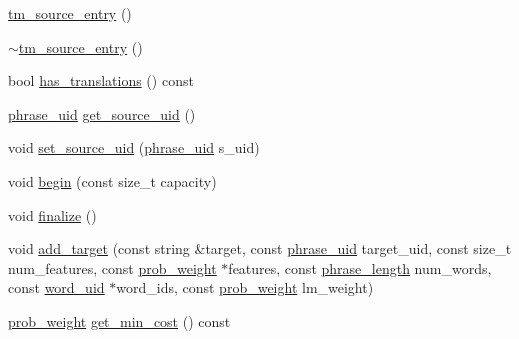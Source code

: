 \begin{DoxyCompactItemize}
\item 
\hyperlink{classuva_1_1smt_1_1bpbd_1_1server_1_1tm_1_1models_1_1tm__source__entry_a2989ee98e0a9a0505cb21259f7dda04b}{tm\+\_\+source\+\_\+entry} ()
\item 
\hyperlink{classuva_1_1smt_1_1bpbd_1_1server_1_1tm_1_1models_1_1tm__source__entry_a9c6a9653a614dc1d06ecea71d5605a1e}{$\sim$tm\+\_\+source\+\_\+entry} ()
\item 
bool \hyperlink{classuva_1_1smt_1_1bpbd_1_1server_1_1tm_1_1models_1_1tm__source__entry_abc7b2b5a3f96ff24a5e546813141c123}{has\+\_\+translations} () const 
\item 
\hyperlink{namespaceuva_1_1smt_1_1bpbd_1_1server_ad18d4cdf5504e76c22b0c124ff60b44f}{phrase\+\_\+uid} \hyperlink{classuva_1_1smt_1_1bpbd_1_1server_1_1tm_1_1models_1_1tm__source__entry_aaa0e8168bcd0f8f889cebb9f41030f52}{get\+\_\+source\+\_\+uid} ()
\item 
void \hyperlink{classuva_1_1smt_1_1bpbd_1_1server_1_1tm_1_1models_1_1tm__source__entry_a95a7e6c78f73a4b8151de898d7df23ce}{set\+\_\+source\+\_\+uid} (\hyperlink{namespaceuva_1_1smt_1_1bpbd_1_1server_ad18d4cdf5504e76c22b0c124ff60b44f}{phrase\+\_\+uid} s\+\_\+uid)
\item 
void \hyperlink{classuva_1_1smt_1_1bpbd_1_1server_1_1tm_1_1models_1_1tm__source__entry_a4f1723b621fb0fb0d90b6a9a57f17887}{begin} (const size\+\_\+t capacity)
\item 
void \hyperlink{classuva_1_1smt_1_1bpbd_1_1server_1_1tm_1_1models_1_1tm__source__entry_a370fd36b585d79ed9c51669d7be2f083}{finalize} ()
\item 
void \hyperlink{classuva_1_1smt_1_1bpbd_1_1server_1_1tm_1_1models_1_1tm__source__entry_a6955e4782b3655323cd2f891b182ae6a}{add\+\_\+target} (const string \&target, const \hyperlink{namespaceuva_1_1smt_1_1bpbd_1_1server_ad18d4cdf5504e76c22b0c124ff60b44f}{phrase\+\_\+uid} target\+\_\+uid, const size\+\_\+t num\+\_\+features, const \hyperlink{namespaceuva_1_1smt_1_1bpbd_1_1server_a01e9ea4de9c226f4464862e84ff0bbcc}{prob\+\_\+weight} $\ast$features, const \hyperlink{namespaceuva_1_1smt_1_1bpbd_1_1server_af068a19c2e03116caf3e3827a3e40e35}{phrase\+\_\+length} num\+\_\+words, const \hyperlink{namespaceuva_1_1smt_1_1bpbd_1_1server_a6bfe45ba344d65a7fdd7d26156328ddc}{word\+\_\+uid} $\ast$word\+\_\+ids, const \hyperlink{namespaceuva_1_1smt_1_1bpbd_1_1server_a01e9ea4de9c226f4464862e84ff0bbcc}{prob\+\_\+weight} lm\+\_\+weight)
\item 
\hyperlink{namespaceuva_1_1smt_1_1bpbd_1_1server_a01e9ea4de9c226f4464862e84ff0bbcc}{prob\+\_\+weight} \hyperlink{classuva_1_1smt_1_1bpbd_1_1server_1_1tm_1_1models_1_1tm__source__entry_aadb4fff504fa475f6df4b1c4f83307b4}{get\+\_\+min\+\_\+cost} () const 

\end{DoxyCompactItemize}
